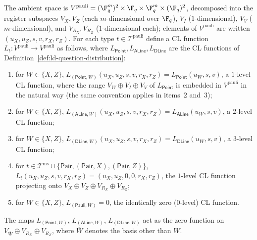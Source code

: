 \begin{definition}
	The ambient space is $V^{\mathrm{pauli}} = (\F_q^m)^2 \times \F_q \times \F_q^m \times (\F_q)^2$, decomposed into the register subspaces $V_X, V_Z$ (each $m$-dimensional over $\F_q$), $V_I$ ($1$-dimensional), $V_V$ ($m$-dimensional), and $V_{R_X}, V_{R_Z}$ ($1$-dimensional each); elements of $V^{\mathrm{pauli}}$ are written $(u_X, u_Z, s, v, r_X, r_Z)$. For each type $t \in \mathcal T^{\mathrm{pauli}}$ define a CL function $L_t\colon V^{\mathrm{pauli}} \to V^{\mathrm{pauli}}$ as follows, where $L_{\mathsf{Point}}, L_{\mathsf{ALine}}, L_{\mathsf{DLine}}$ are the CL functions of Definition~\ref{def:ld-question-distribution}:
	\begin{enumerate}
		\item for $W \in \{X,Z\}$, $L_{(\mathsf{Point},W)}(u_X,u_Z,s,v,r_X,r_Z) = L_{\mathsf{Point}}(u_W,s,v)$, a $1$-level CL function, where the range $V_W \oplus V_I \oplus V_V$ of $L_{\mathsf{Point}}$ is embedded in $V^{\mathrm{pauli}}$ in the natural way (the same convention applies in items~2 and~3);
		\item for $W \in \{X,Z\}$, $L_{(\mathsf{ALine},W)}(u_X,u_Z,s,v,r_X,r_Z) = L_{\mathsf{ALine}}(u_W,s,v)$, a $2$-level CL function;
		\item for $W \in \{X,Z\}$, $L_{(\mathsf{DLine},W)}(u_X,u_Z,s,v,r_X,r_Z) = L_{\mathsf{DLine}}(u_W,s,v)$, a $3$-level CL function;
		\item for $t \in \mathcal T^{\mathrm{ms}} \cup \{\mathsf{Pair}, (\mathsf{Pair},X), (\mathsf{Pair},Z)\}$, $L_t(u_X,u_Z,s,v,r_X,r_Z) = (u_X,u_Z,0,0,r_X,r_Z)$, the $1$-level CL function projecting onto $V_X \oplus V_Z \oplus V_{R_X} \oplus V_{R_Z}$;
		\item for $W \in \{X,Z\}$, $L_{(\mathsf{Pauli},W)} = 0$, the identically zero ($0$-level) CL function.
	\end{enumerate}
	The maps $L_{(\mathsf{Point},W)}$, $L_{(\mathsf{ALine},W)}$, $L_{(\mathsf{DLine},W)}$ act as the zero function on $V_{\overline W} \oplus V_{R_X} \oplus V_{R_Z}$, where $\overline W$ denotes the basis other than $W$.


\end{definition}
